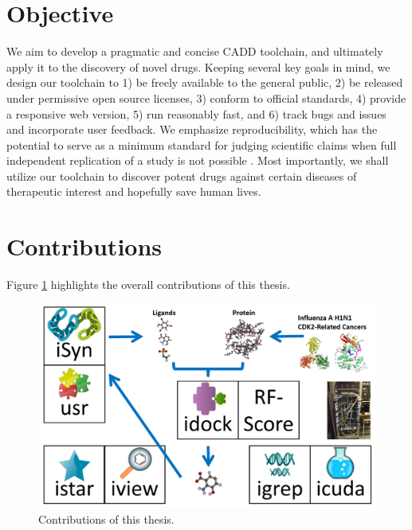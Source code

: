 \section{Objective}

We aim to develop a pragmatic and concise CADD toolchain, and ultimately apply it to the discovery of novel drugs. Keeping several key goals in mind, we design our toolchain to 1) be freely available to the general public, 2) be released under permissive open source licenses, 3) conform to official standards, 4) provide a responsive web version, 5) run reasonably fast, and 6) track bugs and issues and incorporate user feedback. We emphasize reproducibility, which has the potential to serve as a minimum standard for judging scientific claims when full independent replication of a study is not possible \citep{965}. Most importantly, we shall utilize our toolchain to discover potent drugs against certain diseases of therapeutic interest and hopefully save human lives.

\section{Contributions}

Figure \ref{thesis:contributions} highlights the overall contributions of this thesis.

\begin{figure}
\begin{center}
\includegraphics[width=\linewidth]{Contributions.png}
\end{center}
\caption{Contributions of this thesis.}
\label{thesis:contributions}
\end{figure}

